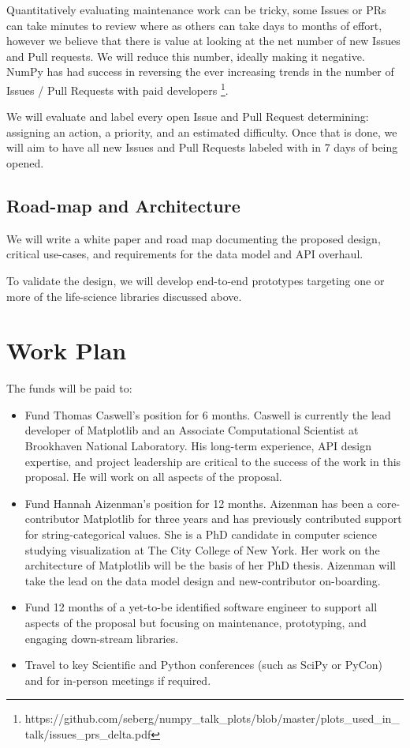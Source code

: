 \documentclass[11pt]{article}  %
\begin{document}
Quantitatively evaluating maintenance work can be tricky, some Issues
or PRs can take minutes to review where as others can take days to
months of effort, however we believe that there is value at looking at
the net number of new Issues and Pull requests.  We will reduce this
number, ideally making it negative.  NumPy has had success in
reversing the ever increasing trends in the number of Issues / Pull
Requests with paid
developers \footnote{https://github.com/seberg/numpy\_talk\_plots/blob/master/plots\_used\_in\_talk/issues\_prs\_delta.pdf}.


We will evaluate and label every open Issue and Pull Request
determining: assigning an action, a priority, and an estimated
difficulty.  Once that is done, we will aim to have all new Issues and
Pull Requests labeled with in 7 days of being opened.


\subsection{Road-map and Architecture}

We will write a white paper and road map documenting the proposed
design, critical use-cases, and requirements for the data model and
API overhaul.

To validate the design, we will develop end-to-end prototypes
targeting one or more of the life-science libraries discussed above.



\section{Work Plan}

The funds will be paid to:


\begin{itemize}[noitemsep]

\item Fund Thomas Caswell's position for 6 months.  Caswell is
  currently the lead developer of Matplotlib and an Associate
  Computational Scientist at Brookhaven National Laboratory.  His
  long-term experience, API design expertise, and project leadership
  are critical to the success of the work in this proposal.  He will work
  on all aspects of the proposal.
\item Fund Hannah Aizenman's position for 12 months.  Aizenman has
  been a core-contributor Matplotlib for three years and has
  previously contributed support for string-categorical values.  She
  is a PhD candidate in computer science studying visualization at The
  City College of New York.  Her work on the architecture of
  Matplotlib will be the basis of her PhD thesis.  Aizenman will take
  the lead on the data model design and new-contributor on-boarding.
\item Fund 12 months of a yet-to-be identified software engineer to
  support all aspects of the proposal but focusing on maintenance,
  prototyping, and engaging down-stream libraries.
\item Travel to key Scientific and Python conferences (such as SciPy
  or PyCon) and for in-person meetings if required.
\end{itemize}
\end{document}
